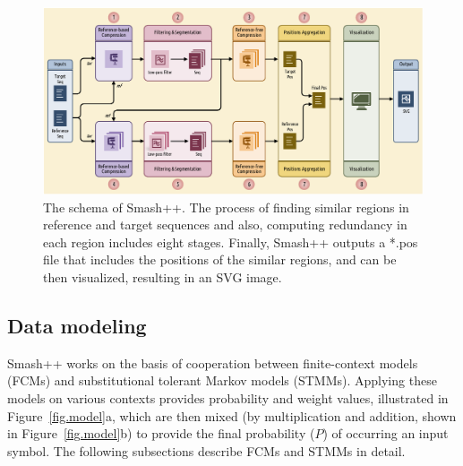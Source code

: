 \documentclass[a4paper,num-refs]{oup-contemporary}
\begin{document}
\begin{figure}[!t]
  \centering
  \includegraphics[width=.9\linewidth]{schema.pdf}
  \caption{The schema of Smash++. The process of finding similar regions in reference and target sequences and also, computing redundancy in each region includes eight stages. Finally, Smash++ outputs a *.pos file that includes the positions of the similar regions, and can be then visualized, resulting in an SVG image.}
  \label{fig.schema}
\end{figure}

\subsection{Data modeling}
Smash++ works on the basis of cooperation between finite-context models (FCMs) and substitutional tolerant Markov models (STMMs). Applying these models on various contexts provides probability and weight values, illustrated in Figure~\ref{fig.model}a, which are then mixed (by multiplication and addition, shown in Figure~\ref{fig.model}b) to provide the final probability ($P$) of occurring an input symbol. The following subsections describe FCMs and STMMs in detail.
\end{document}
